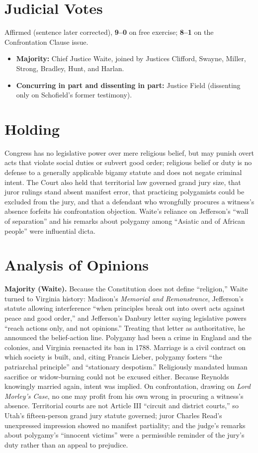 \documentclass[12pt]{article}
\begin{document}
\section{Judicial Votes}

Affirmed (sentence later corrected), \textbf{9--0} on free exercise; \textbf{8--1} on the Confrontation Clause issue.
\begin{itemize}
\item \textbf{Majority:} Chief Justice Waite, joined by Justices Clifford, Swayne, Miller, Strong, Bradley, Hunt, and Harlan.
\item \textbf{Concurring in part and dissenting in part:} Justice Field (dissenting only on Schofield's former testimony).
\end{itemize}

\section{Holding}

Congress has no legislative power over mere religious belief, but may punish overt acts that violate social duties or subvert good order; religious belief or duty is no defense to a generally applicable bigamy statute and does not negate criminal intent. The Court also held that territorial law governed grand jury size, that juror rulings stand absent manifest error, that practicing polygamists could be excluded from the jury, and that a defendant who wrongfully procures a witness's absence forfeits his confrontation objection. Waite's reliance on Jefferson's ``wall of separation'' and his remarks about polygamy among ``Asiatic and of African people'' were influential dicta.

\section{Analysis of Opinions}

\textbf{Majority (Waite).} Because the Constitution does not define ``religion,'' Waite turned to Virginia history: Madison's \textit{Memorial and Remonstrance}, Jefferson's statute allowing interference ``when principles break out into overt acts against peace and good order,'' and Jefferson's Danbury letter saying legislative powers ``reach actions only, and not opinions.'' Treating that letter as authoritative, he announced the belief-action line. Polygamy had been a crime in England and the colonies, and Virginia reenacted its ban in 1788. Marriage is a civil contract on which society is built, and, citing Francis Lieber, polygamy fosters ``the patriarchal principle'' and ``stationary despotism.'' Religiously mandated human sacrifice or widow-burning could not be excused either. Because Reynolds knowingly married again, intent was implied. On confrontation, drawing on \textit{Lord Morley's Case}, no one may profit from his own wrong in procuring a witness's absence. Territorial courts are not Article III ``circuit and district courts,'' so Utah's fifteen-person grand jury statute governed; juror Charles Read's unexpressed impression showed no manifest partiality; and the judge's remarks about polygamy's ``innocent victims'' were a permissible reminder of the jury's duty rather than an appeal to prejudice.
\end{document}
